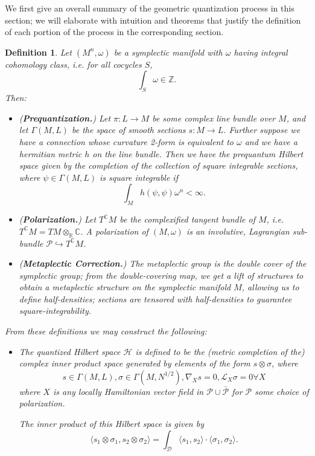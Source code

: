 \documentclass{tufte-handout}
\newtheorem{defn}{Definition}
\begin{document}
We first give an overall summary of the geometric quantization process in this section; we will elaborate with intuition and theorems that justify the definition of each portion of the process in the corresponding section.
\begin{defn}
Let $(M^n,\omega)$ be a symplectic manifold with $\omega$ having integral cohomology class, i.e. for all cocycles $S$,
$$
\int_S \omega \in \mathbb{Z}.
$$
Then:
\begin{itemize}
\item (\textbf{Prequantization.}) Let $\pi: L \to M$ be some \emph{complex line bundle} over $M$, and let $\Gamma(M,L)$ be the space of smooth sections $s: M \to L$. Further suppose we have a connection whose curvature 2-form is equivalent to $\omega$ and we have a hermitian metric $h$ on the line bundle. Then we have the \emph{prequantum Hilbert space} given by the completion of the collection of square integrable sections, where $\psi \in \Gamma(M,L)$ is square integrable if
$$
\int_M h(\psi,\psi) \omega^n < \infty.
$$

\item (\textbf{Polarization.}) Let $T^\mathbb{C}M$ be the complexified tangent bundle of $M$, i.e. $T^\mathbb{C}M = TM \otimes_\mathbb{R} \mathbb{C}$. A \emph{polarization} of $(M,\omega)$ is an \emph{involutive, Lagrangian sub-bundle} $\mathcal{P} \hookrightarrow T^\mathbb{C}M$.

\item (\textbf{Metaplectic Correction.}) The metaplectic group is the double cover of the symplectic group; from the double-covering map, we get a lift of structures to obtain a \emph{metaplectic structure} on the symplectic manifold $M$, allowing us to define half-densities; sections are tensored with half-densities to guarantee square-integrability.
\end{itemize}

From these definitions we may construct the following:
\begin{itemize}
\item The \emph{quantized Hilbert space} $\mathcal{H}$ is defined to be the (metric completion of the) complex inner product space generated by elements of the form $s \otimes \sigma$, where
$$
s \in \Gamma(M,L), \sigma \in \Gamma(M, N^{1/2}), \nabla_X s = 0, \mathcal{L}_X \sigma = 0 \forall X
$$
where $X$ is any locally Hamiltonian vector field in $\mathcal{P} \cup \bar{\mathcal{P}}$ for $\mathcal{P}$ some choice of polarization.

The inner product of this Hilbert space is given by
$$
\langle s_1 \otimes \sigma_1, s_2 \otimes \sigma_2 \rangle = \int_\mathcal{D} \langle s_1,s_2 \rangle \cdot \langle \sigma_1,\sigma_2 \rangle.
$$


\end{itemize}
\end{defn}
\end{document}
